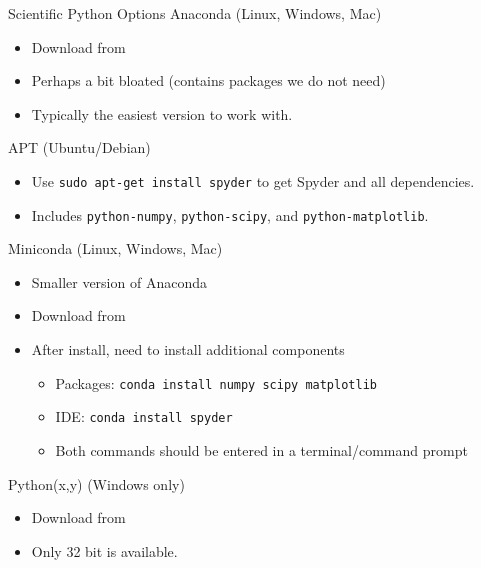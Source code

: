 \documentclass[xcolor=dvipsnames]{beamer}
\begin{document}
\begin{frame}[allowframebreaks]{Scientific Python Options}
    Anaconda (Linux, Windows, Mac)
    \begin{itemize}
        \item Download from 
        \item Perhaps a bit bloated (contains packages we do not need)
        \item Typically the easiest version to work with.
    \end{itemize}
    
    \medskip
    
    APT (Ubuntu/Debian)
    \begin{itemize}
        \item Use \lstinline[style=shell]@sudo apt-get install spyder@ to get Spyder and all dependencies.
        \item Includes \texttt{python-numpy}, \texttt{python-scipy}, and \texttt{python-matplotlib}.
    \end{itemize}
    
    \framebreak
    
    Miniconda (Linux, Windows, Mac)
    \begin{itemize}
        \item Smaller version of Anaconda
        \item Download from 
        \item After install, need to install additional components
        \begin{itemize}
            \item Packages: \lstinline[style=shell]@conda install numpy scipy matplotlib@
            \item IDE: \lstinline[style=shell]@conda install spyder@
            \item Both commands should be entered in a terminal/command prompt
        \end{itemize}
    \end{itemize}
    
    \medskip
    
    Python(x,y) (Windows only)
    \begin{itemize}
        \item Download from 
        \item Only 32 bit is available.
    \end{itemize}
\end{frame}
\end{document}
